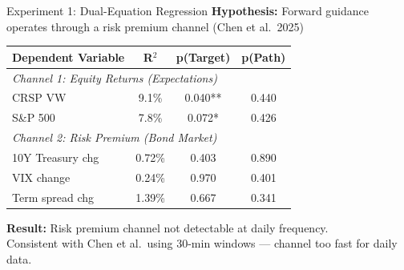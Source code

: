 \documentclass[aspectratio=169, 11pt]{beamer}
\begin{document}
\begin{frame}{Experiment 1: Dual-Equation Regression}
  \textbf{Hypothesis:} Forward guidance operates through a risk premium channel (Chen et al.\ 2025)

  \vspace{0.3em}
  \centering
  \begin{tabular}{lccc}
    \toprule
    Dependent Variable & R$^2$ & p(Target) & p(Path) \\
    \midrule
    \multicolumn{4}{l}{\textit{Channel 1: Equity Returns (Expectations)}} \\
    CRSP VW   & 9.1\% & 0.040** & 0.440 \\
    S\&P 500  & 7.8\% & 0.072*  & 0.426 \\
    \midrule
    \multicolumn{4}{l}{\textit{Channel 2: Risk Premium (Bond Market)}} \\
    10Y Treasury chg & 0.72\% & 0.403 & 0.890 \\
    VIX change       & 0.24\% & 0.970 & 0.401 \\
    Term spread chg  & 1.39\% & 0.667 & 0.341 \\
    \bottomrule
  \end{tabular}

  \vspace{0.5em}
  \textbf{Result:} Risk premium channel not detectable at daily frequency.\\
  Consistent with Chen et al.\ using 30-min windows --- channel too fast for daily data.
\end{frame}
\end{document}
